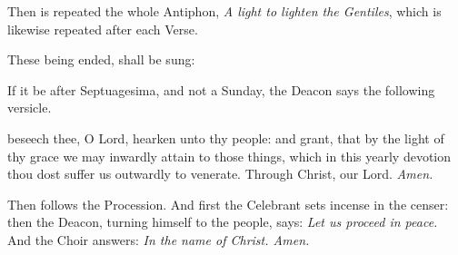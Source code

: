 

\begin{rubric}
    Then is repeated the whole Antiphon, \emph{A light to lighten the Gentiles}, which is likewise repeated after each Verse.
\end{rubric}





\begin{rubric}
    These being ended, shall be sung:
\end{rubric}




\begin{rubric}
    If it be after Septuagesima, and not a Sunday, the Deacon says the following versicle.
\end{rubric}

 beseech thee, O Lord, hearken unto thy people: and grant, that by the light of thy grace we may inwardly attain to those things, which in this yearly devotion thou dost suffer us outwardly to venerate. Through Christ, our Lord. \textit{Amen.}

\begin{rubric}
    Then follows the Procession. And first the Celebrant sets incense in the censer: then the Deacon, turning himself to the people, says: \emph{Let us proceed in peace.} And the Choir answers: \emph{In the name of Christ. Amen.}
\end{rubric}


